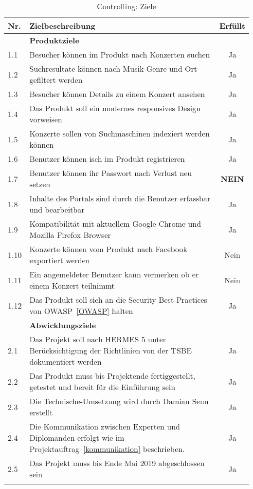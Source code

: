 \begin{longtable}[]{@{}lp{10.5cm}c@{}}
  \toprule
  Nr.  & Zielbeschreibung                                                                                                   & Erfüllt\tabularnewline
  \toprule
  \endhead
       & \textbf{Produktziele}\tabularnewline
  \midrule
  1.1  & Besucher können im Produkt nach Konzerten suchen                                                                   & Ja\tabularnewline
  1.2  & Suchresultate können nach Musik-Genre und Ort gefiltert werden                                                     & Ja\tabularnewline
  1.3  & Besucher können Details zu einem Konzert ansehen                                                                   & Ja\tabularnewline
  1.4  & Das Produkt soll ein modernes responsives Design vorweisen                                                         & Ja\tabularnewline
  1.5  & Konzerte sollen von Suchmaschinen indexiert werden können                                                          & Ja\tabularnewline
  1.6  & Benutzer können isch im Produkt registrieren                                                                       & Ja\tabularnewline
  1.7  & Benutzer können ihr Passwort nach Verlust neu setzen                                                               & \textbf{NEIN}\tabularnewline
  1.8  & Inhalte des Portals sind durch die Benutzer erfassbar und bearbeitbar                                              & Ja\tabularnewline
  1.9  & Kompatibilität mit aktuellem Google Chrome und Mozilla Firefox Browser                                             & Ja\tabularnewline
  1.10 & Konzerte können vom Produkt nach Facebook exportiert werden                                                        & Nein\tabularnewline
  1.11 & Ein angemeldeter Benutzer kann vermerken ob er einem Konzert teilnimmt                                             & Nein\tabularnewline
  1.12 & Das Produkt soll sich an die Security Best-Practices von OWASP~\ref{OWASP} halten                                  & Ja\tabularnewline
  \toprule
       & \textbf{Abwicklungsziele}\tabularnewline
  \midrule
  2.1  & Das Projekt soll nach HERMES 5 unter Berücksichtigung der Richtlinien von der TSBE dokumentiert werden             & Ja\tabularnewline
  2.2  & Das Produkt muss bis Projektende fertiggestellt, getestet und bereit für die Einführung sein                       & Ja\tabularnewline
  2.3  & Die Technische-Umsetzung wird durch Damian Senn erstellt                                                           & Ja\tabularnewline
  2.4  & Die Kommunikation zwischen Experten und Diplomanden erfolgt wie im Projektauftrag~\ref{kommunikation} beschrieben. & Ja\tabularnewline
  2.5  & Das Projekt muss bis Ende Mai 2019 abgeschlossen sein                                                              & Ja\tabularnewline
  \bottomrule
  \caption{Controlling: Ziele}
\end{longtable}

